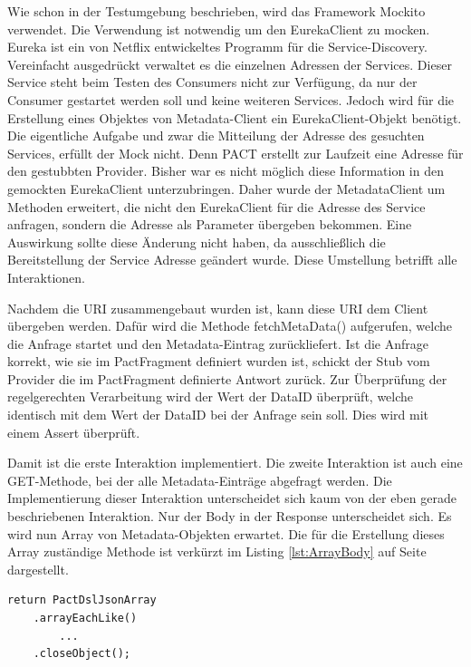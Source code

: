 \documentclass{llncs}
\begin{document}
Wie schon in der Testumgebung beschrieben, wird das Framework Mockito verwendet. Die Verwendung ist notwendig um den EurekaClient zu mocken. Eureka \cite{Ranganathan2012} ist ein von Netflix entwickeltes Programm für die Service-Discovery. Vereinfacht ausgedrückt verwaltet es die einzelnen Adressen der Services. Dieser Service steht beim Testen des Consumers nicht zur Verfügung, da nur der Consumer gestartet werden soll und keine weiteren Services. Jedoch wird für die Erstellung eines Objektes von Metadata-Client ein EurekaClient-Objekt benötigt. Die eigentliche Aufgabe und zwar die Mitteilung der Adresse des gesuchten Services, erfüllt der Mock nicht. Denn PACT erstellt zur Laufzeit eine Adresse für den gestubbten Provider. Bisher war es nicht möglich diese Information in den gemockten EurekaClient unterzubringen. Daher wurde der MetadataClient um Methoden erweitert, die nicht den EurekaClient für die Adresse des Service anfragen, sondern die Adresse als Parameter übergeben bekommen. Eine Auswirkung sollte diese Änderung nicht haben, da ausschließlich die Bereitstellung der Service Adresse geändert wurde. Diese Umstellung betrifft alle Interaktionen.

Nachdem die URI zusammengebaut wurden ist, kann diese URI dem Client übergeben werden. Dafür wird die Methode fetchMetaData() aufgerufen, welche die Anfrage startet und den Metadata-Eintrag zurückliefert. Ist die Anfrage korrekt, wie sie im PactFragment definiert wurden ist, schickt der Stub vom Provider die im PactFragment definierte Antwort zurück. Zur Überprüfung der regelgerechten Verarbeitung wird der Wert der DataID überprüft, welche identisch mit dem Wert der DataID bei der Anfrage sein soll. Dies wird mit einem Assert überprüft.

Damit ist die erste Interaktion implementiert. Die zweite Interaktion ist auch eine GET-Methode, bei der alle Metadata-Einträge abgefragt werden. Die Implementierung dieser Interaktion unterscheidet sich kaum von der eben gerade beschriebenen Interaktion. Nur der Body in der Response unterscheidet sich. Es wird nun Array von Metadata-Objekten erwartet. Die für die Erstellung dieses Array zuständige Methode ist verkürzt im Listing \ref{lst:ArrayBody} auf Seite \pageref{lst:ArrayBody} dargestellt.

\lstset{language = Java}
\begin{lstlisting}[caption=Erstellung eines Array,label={lst:ArrayBody}]
return PactDslJsonArray
    .arrayEachLike()
        ...
    .closeObject();
\end{lstlisting}
\end{document}
